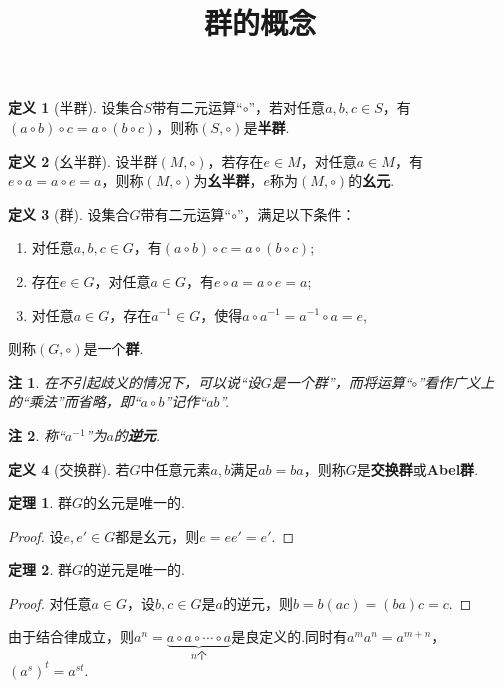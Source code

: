\documentclass[12pt]{ctexart}
\title{\vspace{-2em}\textbf{群的概念}\vspace{-2em}}
\date{ }
\theoremstyle{definition}
\newtheorem{definition}{定义}
\newtheorem{theorem}{定理}
\theoremstyle{plain}
\newtheorem*{remark}{注}
\begin{document}
	\maketitle
	\begin{definition}[半群]
		设集合$S$带有二元运算“$\circ$”，若对任意$a,b,c\in S$，有$(a\circ b)\circ c=a\circ(b\circ c)$，则称$(S,\circ)$是\textbf{半群}.
	\end{definition}
	\begin{definition}[幺半群]
		设半群$(M,\circ)$，若存在$e\in M$，对任意$a\in M$，有$e\circ a=a\circ e=a$，则称$(M,\circ)$为\textbf{幺半群}，$e$称为$(M,\circ)$的\textbf{幺元}.
	\end{definition}
	\begin{definition}[群]
		设集合$G$带有二元运算“$\circ$”，满足以下条件：
		\begin{enumerate}
			\item 对任意$a,b,c\in G$，有$(a\circ b)\circ c=a\circ (b\circ c)$;
			\item 存在$e\in G$，对任意$a\in G$，有$e\circ a=a\circ e=a$;
			\item 对任意$a\in G$，存在$a^{-1}\in G$，使得$a\circ a^{-1}=a^{-1}\circ a=e$,
		\end{enumerate}
		则称$(G,\circ)$是一个\textbf{群}.
	\end{definition}
	\begin{remark}
		在不引起歧义的情况下，可以说“设$G$是一个群”，而将运算“$\circ$”看作广义上的“乘法”而省略，即“$a\circ b$”记作“$ab$”.
	\end{remark}
	\begin{remark}
		称“$a^{-1}$”为$a$的\textbf{逆元}.
	\end{remark}
	\begin{definition}[交换群]
		若$G$中任意元素$a,b$满足$ab=ba$，则称$G$是\textbf{交换群}或\textbf{Abel群}.
	\end{definition}
	\begin{theorem}
		群$G$的幺元是唯一的.
	\end{theorem}
	\begin{proof}
		设$e,e'\in G$都是幺元，则$e=ee'=e'$.
	\end{proof}
	\begin{theorem}
		群$G$的逆元是唯一的.
	\end{theorem}
	\begin{proof}
		对任意$a\in G$，设$b,c\in G$是$a$的逆元，则$b=b(ac)=(ba)c=c$.
	\end{proof}
	由于结合律成立，则$a^n=\underbrace{a\circ a\circ\cdots\circ a}_{n\text{个}}$是良定义的.同时有$a^ma^n=a^{m+n}$，$(a^s)^t=a^{st}$.
\end{document}
